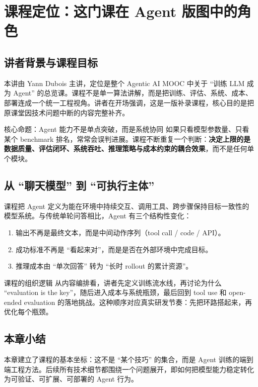 \documentclass[a4paper]{article}
\begin{document}
\section{课程定位：这门课在 Agent 版图中的角色}

\subsection{讲者背景与课程目标}
本讲由 Yann Dubois 主讲，定位是整个 Agentic AI MOOC 中关于 ``训练 LLM 成为 Agent'' 的总览课。课程不是单一算法讲解，而是把训练、评估、系统、成本、部署连成一个统一工程视角。讲者在开场强调，这是一版补录课程，核心目的是把原课堂因技术问题中断的内容完整补齐。

\begin{importantbox}{核心命题：Agent 能力不是单点突破，而是系统协同}
如果只看模型参数量、只看某个 benchmark 排名，常常会误判进展。课程不断重复一个判断：\textbf{决定上限的是数据质量、评估闭环、系统吞吐、推理策略与成本约束的耦合效果}，而不是任何单个模块。
\end{importantbox}

\subsection{从 ``聊天模型'' 到 ``可执行主体''}
课程把 Agent 定义为能在环境中持续交互、调用工具、跨步骤保持目标一致性的模型系统。与传统单轮问答相比，Agent 有三个结构性变化：
\begin{enumerate}
    \item 输出不再是最终文本，而是中间动作序列（tool call / code / API）。
    \item 成功标准不再是 ``看起来对''，而是是否在外部环境中完成目标。
    \item 推理成本由 ``单次回答'' 转为 ``长时 rollout 的累计资源''。
\end{enumerate}

\begin{knowledgebox}{课程的组织逻辑}
从内容编排看，讲者先定义训练流水线，再讨论为什么 ``evaluation is the key''，随后进入成本与系统瓶颈，最后回到 tool use 和 open-ended evaluation 的落地挑战。这种顺序对应真实研发节奏：先把环路搭起来，再优化每个瓶颈。
\end{knowledgebox}

\subsection{本章小结}
本章建立了课程的基本坐标：这不是 ``某个技巧'' 的集合，而是 Agent 训练的端到端工程方法。后续所有技术细节都围绕一个问题展开，即如何把模型能力稳定转化为可验证、可扩展、可部署的 Agent 行为。
\end{document}
